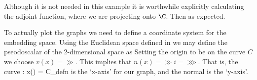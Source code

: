 Although it is not needed in this example it is worthwhile explicitly
calculating the adjoint function,
where we are projecting onto $\C$.
Then
as expected.

To actually plot the graphs we need to define a coordinate system for
the embedding space.
Using the Euclidean space defined in 
we may define the pseodoscalar of the 2-dimensional space as
Setting the origin to be on the curve $C$ we choose
$v(x) = \gg$.
This implies that $n(x) = \gg i = \ggg$.
That is, the curve 
\eql
{
 \C : x(\tau) = \tau \gg
}{C_defn}
 is the `x-axis' for our graph,
and the normal is the `y-axis'.

